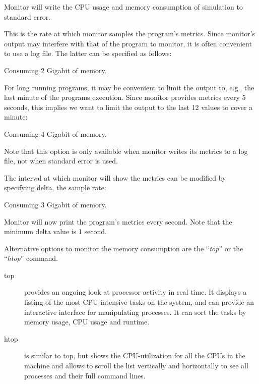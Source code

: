 Monitor will write the CPU usage and memory consumption of simulation to standard error.

This is the rate at which monitor samples the program's metrics. Since
monitor's output may interfere with that of the program to monitor, it is often
convenient to use a log file. The latter can be specified as follows:

\begin{prompt}
Consuming 2 Gigabit of memory.
\end{prompt}

For long running programs, it may be convenient to limit the output to, e.g.,
the last minute of the programs execution. Since monitor provides metrics every
5 seconds, this implies we want to limit the output to the last 12 values to
cover a minute:

\begin{prompt}
Consuming 4 Gigabit of memory.
\end{prompt}

Note that this option is only available when monitor writes its metrics to a
log file, not when standard error is used.

The interval at which monitor will show the metrics can be modified by
specifying delta, the sample rate:

\begin{prompt}
Consuming 3 Gigabit of memory.
\end{prompt}

Monitor will now print the program's metrics every second. Note that the
minimum delta value is 1 second.

Alternative options to monitor the memory consumption are the ``\emph{top}''
or the ``\emph{htop}'' command.

\begin{description}
  \item[top] provides an ongoing look at processor activity in real time. It displays a listing of the most CPU-intensive tasks on the system, and can provide an interactive interface for manipulating processes. It can sort the tasks by memory usage, CPU usage and runtime.
  \item[htop] is similar to top, but shows the CPU-utilization for all the CPUs in the machine and allows to scroll the list vertically and horizontally to see all processes and their full command lines.
\end{description}

